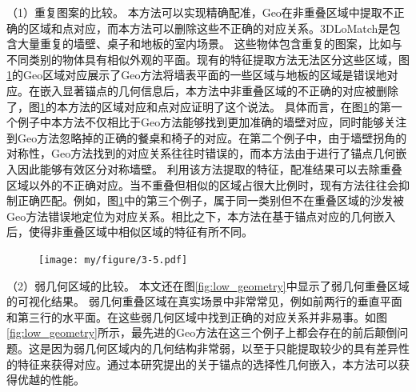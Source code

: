     （1）重复图案的比较。
    本方法可以实现精确配准，Geo在非重叠区域中提取不正确的区域和点对应，而本方法可以删除这些不正确的对应关系。3DLoMatch是包含大量重复的墙壁、桌子和地板的室内场景。
    这些物体包含重复的图案，比如与不同类别的物体具有相似外观的平面。现有的特征提取方法无法区分这些区域，图\ref{fig:cor_geo}的Geo区域对应展示了Geo方法将墙表平面的一些区域与地板的区域是错误地对应。在嵌入显著锚点的几何信息后，本方法中非重叠区域的不正确的对应被删除了，图\ref{fig:cor_geo}的本方法的区域对应和点对应证明了这个说法。
    具体而言，在图\ref{fig:cor_geo}的第一个例子中本方法不仅相比于Geo方法能够找到更加准确的墙壁对应，同时能够关注到Geo方法忽略掉的正确的餐桌和椅子的对应。在第二个例子中，由于墙壁拐角的对称性，Geo方法找到的对应关系往往时错误的，而本方法由于进行了锚点几何嵌入因此能够有效区分对称墙壁。
    利用该方法提取的特征，配准结果可以去除重叠区域以外的不正确对应。当不重叠但相似的区域占很大比例时，现有方法往往会抑制正确匹配。例如，图\ref{fig:cor_geo}中的第三个例子，属于同一类别但不在重叠区域的沙发被Geo方法错误地定位为对应关系。相比之下，本方法在基于锚点对应的几何嵌入后，使得非重叠区域中相似区域的特征有所不同。\par
    \vspace{-0.1cm}
    \begin{figure}[ht]
        \centering
        \texttt{[image: my/figure/3-5.pdf]}
        \label{fig:cor_geo}
    \end{figure}
    \vspace{-0.35cm}

    （2）弱几何区域的比较。
    本文还在图\ref{fig:low_geometry}中显示了弱几何重叠区域的可视化结果。
    弱几何重叠区域在真实场景中非常常见，例如前两行的垂直平面和第三行的水平面。在这些弱几何区域中找到正确的对应关系并非易事。如图\ref{fig:low_geometry}所示，最先进的Geo方法在这三个例子上都会存在的前后颠倒问题。这是因为弱几何区域内的几何结构非常弱，以至于只能提取较少的具有差异性的特征来获得对应。通过本研究提出的关于锚点的选择性几何嵌入，本方法可以获得优越的性能。

